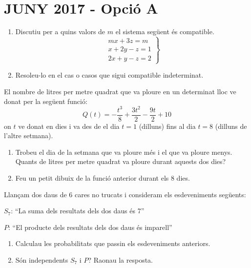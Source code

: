 \documentclass[11pt, a4paper, pdf]{book}
\begin{document}
 
 



\section*{JUNY 2017 - Opció A} 

\begin{mylist}
	
\item \begin{enumerate}
	\item Discutiu per a quins valors de $m$ el sistema següent és compatible.
	\[  \left. \begin{array}{ll} mx+3z=m \\ x+2y-z=1 \\ 2x+y-z=2  \end{array} \right\} \]
	
	\item Resoleu-lo en el cas o casos que sigui compatible indeterminat.

\end{enumerate}

\item El nombre de litres per metre quadrat que va ploure en un determinat lloc ve donat per la següent funció:
\[  Q(t) =-\frac{t^3}{8}+ \frac{3t^2}{2}-\frac{9t}{2} +10 \]
	on $t$ ve donat en dies i va des de el dia $t=1$ (dilluns) fins al dia $t=8$ (dilluns de l'altre setmana).
	\begin{enumerate}
		\item Trobeu el dia de la setmana que va ploure més  i el que va ploure menys. Quants de litres per metre quadrat
		va ploure durant aquests dos dies? 
		
		\item Feu un petit dibuix  de la funció anterior durant els 8 dies. 
	\end{enumerate} 

 
\item Llançam dos daus de 6 cares no trucats i consideram els esdeveniments següents:

\quad 
\quad $S_7$: ``La suma dels resultats dels dos daus és 7''


\quad 
\quad $P$: ``El producte dels resultats dels dos daus és imparell''

\begin{enumerate}
	\item Calculau les probabilitats que passin els esdeveniments anteriors.
	\item Són independents $S_7$ i $P$? Raonau la resposta.
\end{enumerate}


\end{mylist}
\end{document}
